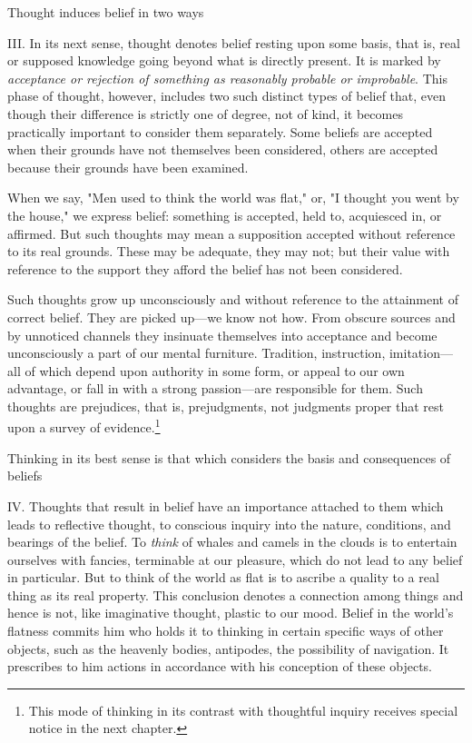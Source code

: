 \documentclass[letterpaper]{book}
\begin{document}
Thought induces belief in two ways

III. In its next sense, thought denotes belief resting upon some basis,
that is, real or supposed knowledge going beyond what is directly
present. It is marked by \emph{acceptance or rejection of something as
reasonably probable or improbable}. This phase of thought, however,
includes two such distinct types of belief that, even though their
difference is strictly one of degree, not of kind, it becomes
practically important to consider them separately. Some beliefs are
accepted when their grounds have not themselves been considered, others
are accepted because their grounds have been examined.

When we say, "Men used to think the world was flat," or, "I thought you
went by the house," we express belief: something is accepted, held to,
acquiesced in, or affirmed. But such thoughts may mean a supposition
accepted without reference to its real grounds. These may be adequate,
they may not; but their value with reference to the support they afford
the belief has not been considered.

Such thoughts grow up unconsciously and without reference to the
attainment of correct belief. They are picked up---we know not how. From
obscure sources and by unnoticed channels they insinuate themselves into
acceptance and become unconsciously a part of our mental furniture.
Tradition, instruction, imitation---all of which depend upon authority
in some form, or appeal to our own advantage, or fall in with a strong
passion---are responsible for them. Such thoughts are prejudices, that
is, prejudgments,
not
judgments proper that rest upon a survey of
evidence.\footnote{This mode of thinking in its contrast with thoughtful inquiry receives
special notice in the next chapter.}

Thinking in its best sense is that which considers the basis and
consequences of beliefs

IV. Thoughts that result in belief have an importance attached to them
which leads to reflective thought, to conscious inquiry into the nature,
conditions, and bearings of the belief. To \emph{think} of whales and
camels in the clouds is to entertain ourselves with fancies, terminable
at our pleasure, which do not lead to any belief in particular. But to
think of the world as flat is to ascribe a quality to a real thing as
its real property. This conclusion denotes a connection among things and
hence is not, like imaginative thought, plastic to our mood. Belief in
the world's flatness commits him who holds it to thinking in certain
specific ways of other objects, such as the heavenly bodies, antipodes,
the possibility of navigation. It prescribes to him actions in
accordance with his conception of these objects.
\end{document}
